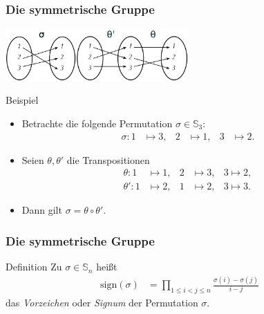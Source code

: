 \documentclass{beamer}
\renewcommand{\emph}[1]{{\textcolor{solarizedRed}{\itshape #1}}}
\renewcommand\SS{\mathbb S}
\newcommand\sign{\mathrm{sign}}
\begin{document}
\begin{frame}\frametitle{Die symmetrische Gruppe}
	\includegraphics[height=20mm]{pics/sigma.pdf}\hfill\includegraphics[height=20mm]{pics/transpositions.pdf}
	\begin{block}{Beispiel}
		\begin{itemize}
			\item Betrachte die folgende Permutation $\sigma\in\SS_3$:
				\begin{align*}
					\sigma:1&\mapsto 3,&2&\mapsto 1,&3&\mapsto 2.
				\end{align*}
			\item Seien $\theta,\theta'$ die Transpositionen 
				\begin{align*}
					\theta:1&\mapsto 1,&2&\mapsto 3,&3\mapsto 2,\\
					\theta':1&\mapsto 2,&1&\mapsto 2,&3\mapsto 3.
				\end{align*}
			\item Dann gilt $\sigma=\theta\circ\theta'.$
		\end{itemize}
	\end{block}
\end{frame}

\begin{frame}\frametitle{Die symmetrische Gruppe}
	\begin{block}{Definition}
		Zu $\sigma\in\SS_n$ hei\ss t
		\begin{align*}
			\sign(\sigma)&=\prod_{1\leq i<j\leq n}\frac{\sigma(i)-\sigma(j)}{i-j}
		\end{align*}
		das \emph{Vorzeichen} oder \emph{Signum} der Permutation $\sigma$.
	\end{block}
\end{frame}
\end{document}
